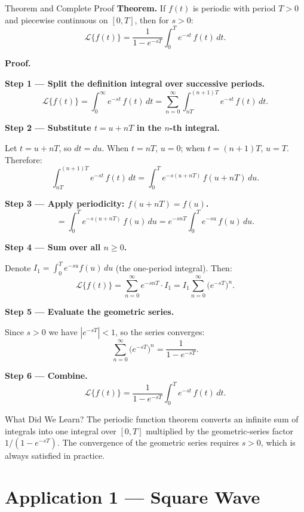 \documentclass[12pt,a4paper]{article}
\begin{document}
\begin{infobox}{Theorem and Complete Proof}
\textbf{Theorem.}  If $f(t)$ is periodic with period $T > 0$ and piecewise
continuous on $[0,T]$, then for $s > 0$:
\[
  \mathcal{L}\{f(t)\} = \frac{1}{1 - e^{-sT}} \int_0^T e^{-st}\,f(t)\,dt.
\]

\textbf{Proof.}

\textbf{Step 1 --- Split the definition integral over successive periods.}
\[
  \mathcal{L}\{f(t)\}
  = \int_0^\infty e^{-st}\,f(t)\,dt
  = \sum_{n=0}^{\infty} \int_{nT}^{(n+1)T} e^{-st}\,f(t)\,dt.
\]

\textbf{Step 2 --- Substitute $t = u + nT$ in the $n$-th integral.}

Let $t = u + nT$, so $dt = du$.  When $t = nT$, $u = 0$; when
$t = (n+1)T$, $u = T$.  Therefore:
\[
  \int_{nT}^{(n+1)T} e^{-st}\,f(t)\,dt
  = \int_0^T e^{-s(u+nT)}\,f(u+nT)\,du.
\]

\textbf{Step 3 --- Apply periodicity: $f(u + nT) = f(u)$.}
\[
  = \int_0^T e^{-s(u+nT)}\,f(u)\,du
  = e^{-snT}\int_0^T e^{-su}\,f(u)\,du.
\]

\textbf{Step 4 --- Sum over all $n \geq 0$.}

Denote $I_1 = \int_0^T e^{-su}f(u)\,du$ (the one-period integral).  Then:
\[
  \mathcal{L}\{f(t)\}
  = \sum_{n=0}^{\infty} e^{-snT} \cdot I_1
  = I_1 \sum_{n=0}^{\infty} \bigl(e^{-sT}\bigr)^n.
\]

\textbf{Step 5 --- Evaluate the geometric series.}

Since $s > 0$ we have $|e^{-sT}| < 1$, so the series converges:
\[
  \sum_{n=0}^{\infty} \bigl(e^{-sT}\bigr)^n = \frac{1}{1 - e^{-sT}}.
\]

\textbf{Step 6 --- Combine.}
\[
  \boxed{\mathcal{L}\{f(t)\} = \frac{1}{1 - e^{-sT}} \int_0^T e^{-st}\,f(t)\,dt.}
\]
\end{infobox}

\begin{learnbox}{What Did We Learn?}
The periodic function theorem converts an infinite sum of integrals into one
integral over $[0,T]$ multiplied by the geometric-series factor
$1/(1-e^{-sT})$.  The convergence of the geometric series requires $s > 0$,
which is always satisfied in practice.
\end{learnbox}

\section{Application 1 --- Square Wave}
\end{document}
